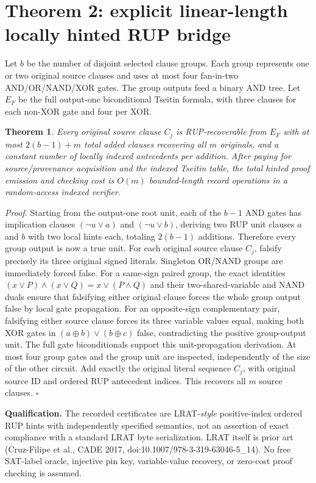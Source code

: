 \documentclass[11pt]{article}
\newtheorem{theorem}{Theorem}
\begin{document}
\section{Theorem 2: explicit linear-length locally hinted RUP bridge}
Let $b$ be the number of disjoint selected clause groups. Each group represents one or two original source clauses and uses at most four fan-in-two AND/OR/NAND/XOR gates. The group outputs feed a binary AND tree. Let $E_F$ be the full output-one biconditional Tseitin formula, with three clauses for each non-XOR gate and four per XOR.
\begin{theorem}
Every original source clause $C_j$ is RUP-recoverable from $E_F$ with at most $2(b-1)+m$ total added clauses recovering all $m$ originals, and a constant number of locally indexed antecedents per addition. After paying for source/provenance acquisition and the indexed Tseitin table, the total hinted proof emission and checking cost is $O(m)$ bounded-length record operations in a random-access indexed verifier.
\end{theorem}
\noindent\textit{Proof.} Starting from the output-one root unit, each of the $b-1$ AND gates has implication clauses $(\neg u\vee a)$ and $(\neg u\vee b)$, deriving two RUP unit clauses $a$ and $b$ with two local hints each, totaling $2(b-1)$ additions. Therefore every group output is now a true unit. For each original source clause $C_j$, falsify precisely its three original signed literals. Singleton OR/NAND groups are immediately forced false. For a same-sign paired group, the exact identities $(x\vee P)\land(x\vee Q)=x\vee(P\land Q)$ and their two-shared-variable and NAND duals ensure that falsifying either original clause forces the whole group output false by local gate propagation. For an opposite-sign complementary pair, falsifying either source clause forces its three variable values equal, making both XOR gates in $(a\oplus b)\vee(b\oplus c)$ false, contradicting the positive group-output unit. The full gate biconditionals support this unit-propagation derivation. At most four group gates and the group unit are inspected, independently of the size of the other circuit. Add exactly the original literal sequence $C_j$, with original source ID and ordered RUP antecedent indices. This recovers all $m$ source clauses. \hfill$\square$

\noindent\textbf{Qualification.} The recorded certificates are LRAT-\emph{style} positive-index ordered RUP hints with independently specified semantics, not an assertion of exact compliance with a standard LRAT byte serialization. LRAT itself is prior art (Cruz-Filipe et al., CADE 2017, doi:10.1007/978-3-319-63046-5\_14). No free SAT-label oracle, injective pin key, variable-value recovery, or zero-cost proof checking is assumed.
\end{document}
